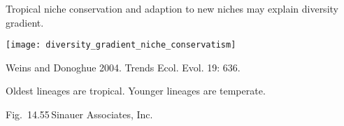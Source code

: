 \documentclass[t]{beamer}
\begin{document}
\begin{frame}[t]{Tropical niche conservation and adaption to new niches may explain diversity gradient.}

	{\centering
		\texttt{[image: diversity\_gradient\_niche\_conservatism]}\par
	}

	\vfilll
	
	\hfill \tiny Weins and Donoghue	2004. Trends Ecol. Evol. 19: 636.
\end{frame}

{
\begin{frame}[t]{Oldest lineages are tropical. Younger lineages are temperate.}


	\vfilll

	\tiny \hfill Fig.~14.55\,\textcopyright Sinauer Associates, Inc.
\end{frame}
}
\end{document}
